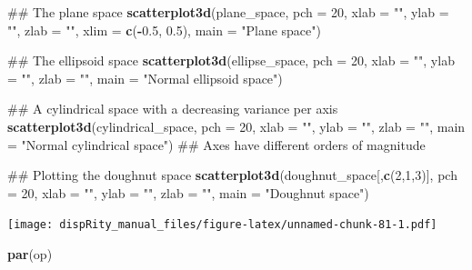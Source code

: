 \documentclass[]{book}
\newenvironment{Shaded}{\begin{snugshade}}{\end{snugshade}}
\newcommand{\KeywordTok}[1]{\textcolor[rgb]{0.13,0.29,0.53}{\textbf{#1}}}
\newcommand{\DataTypeTok}[1]{\textcolor[rgb]{0.13,0.29,0.53}{#1}}
\newcommand{\DecValTok}[1]{\textcolor[rgb]{0.00,0.00,0.81}{#1}}
\newcommand{\FloatTok}[1]{\textcolor[rgb]{0.00,0.00,0.81}{#1}}
\newcommand{\StringTok}[1]{\textcolor[rgb]{0.31,0.60,0.02}{#1}}
\newcommand{\OperatorTok}[1]{\textcolor[rgb]{0.81,0.36,0.00}{\textbf{#1}}}
\newcommand{\NormalTok}[1]{#1}
\theoremstyle{definition}
\theoremstyle{definition}
\theoremstyle{remark}
\begin{document}
\begin{Shaded}
\begin{Highlighting}[]
\NormalTok{## The plane space}
\KeywordTok{scatterplot3d}\NormalTok{(plane_space, }\DataTypeTok{pch =} \DecValTok{20}\NormalTok{, }\DataTypeTok{xlab =} \StringTok{""}\NormalTok{, }\DataTypeTok{ylab =} \StringTok{""}\NormalTok{, }\DataTypeTok{zlab =} \StringTok{""}\NormalTok{,}
              \DataTypeTok{xlim =} \KeywordTok{c}\NormalTok{(}\OperatorTok{-}\FloatTok{0.5}\NormalTok{, }\FloatTok{0.5}\NormalTok{), }\DataTypeTok{main =} \StringTok{"Plane space"}\NormalTok{)}

\NormalTok{## The ellipsoid space}
\KeywordTok{scatterplot3d}\NormalTok{(ellipse_space, }\DataTypeTok{pch =} \DecValTok{20}\NormalTok{, }\DataTypeTok{xlab =} \StringTok{""}\NormalTok{, }\DataTypeTok{ylab =} \StringTok{""}\NormalTok{, }\DataTypeTok{zlab =} \StringTok{""}\NormalTok{,}
              \DataTypeTok{main =} \StringTok{"Normal ellipsoid space"}\NormalTok{)}

\NormalTok{## A cylindrical space with a decreasing variance per axis}
\KeywordTok{scatterplot3d}\NormalTok{(cylindrical_space, }\DataTypeTok{pch =} \DecValTok{20}\NormalTok{, }\DataTypeTok{xlab =} \StringTok{""}\NormalTok{, }\DataTypeTok{ylab =} \StringTok{""}\NormalTok{, }\DataTypeTok{zlab =} \StringTok{""}\NormalTok{,}
              \DataTypeTok{main =} \StringTok{"Normal cylindrical space"}\NormalTok{)}
\NormalTok{## Axes have different orders of magnitude}

\NormalTok{## Plotting the doughnut space}
\KeywordTok{scatterplot3d}\NormalTok{(doughnut_space[,}\KeywordTok{c}\NormalTok{(}\DecValTok{2}\NormalTok{,}\DecValTok{1}\NormalTok{,}\DecValTok{3}\NormalTok{)], }\DataTypeTok{pch =} \DecValTok{20}\NormalTok{, }\DataTypeTok{xlab =} \StringTok{""}\NormalTok{, }\DataTypeTok{ylab =} \StringTok{""}\NormalTok{,}
              \DataTypeTok{zlab =} \StringTok{""}\NormalTok{, }\DataTypeTok{main =} \StringTok{"Doughnut space"}\NormalTok{)}
\end{Highlighting}
\end{Shaded}

\texttt{[image: dispRity\_manual\_files/figure-latex/unnamed-chunk-81-1.pdf]}

\begin{Shaded}
\begin{Highlighting}[]
\KeywordTok{par}\NormalTok{(op)}
\end{Highlighting}
\end{Shaded}
\end{document}
